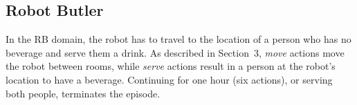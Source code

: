 


\subsection{Robot Butler}

In the RB domain, the robot has to travel to the location of a person who 
has no beverage and serve them a drink. As described in Section~3, 
\textit{move} actions move the robot between rooms, while \textit{serve} 
actions result in a person at the robot's location to have a beverage. 
Continuing for one hour (six actions), or serving both people, 
terminates the episode.










